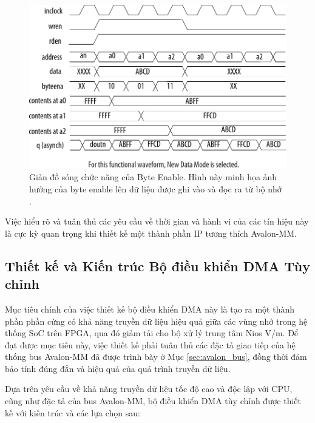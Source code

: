 \begin{figure}[htbp]
    \centering
    \includegraphics[width=0.8\linewidth]{Images/02_02_Memory_ByteEnable.pdf}
    \caption{Giản đồ sóng chức năng của Byte Enable. Hình này minh họa ảnh hưởng của byte enable lên dữ liệu được ghi vào và đọc ra từ bộ nhớ \cite{memory_byteenable}.}
    \label{fig:02_02_memory_byteenable} %
\end{figure}



Việc hiểu rõ và tuân thủ các yêu cầu về thời gian và hành vi của các tín hiệu này là cực kỳ quan trọng khi thiết kế một thành phần IP tương thích Avalon-MM.

\subsection{Thiết kế và Kiến trúc Bộ điều khiển DMA Tùy chỉnh}
\label{sec:dma_design_and_architecture} %
Mục tiêu chính của việc thiết kế bộ điều khiển DMA này là tạo ra một thành phần phần cứng có khả năng truyền dữ liệu hiệu quả giữa các vùng nhớ trong hệ thống SoC trên FPGA, qua đó giảm tải cho bộ xử lý trung tâm Nios V/m. Để đạt được mục tiêu này, việc thiết kế phải tuân thủ các đặc tả giao tiếp của hệ thống bus Avalon-MM đã được trình bày ở Mục \ref{sec:avalon_bus}, đồng thời đảm bảo tính đúng đắn và hiệu quả của quá trình truyền dữ liệu.

Dựa trên yêu cầu về khả năng truyền dữ liệu tốc độ cao và độc lập với CPU, cũng như đặc tả của bus Avalon-MM, bộ điều khiển DMA tùy chỉnh được thiết kế với kiến trúc và các lựa chọn sau:


